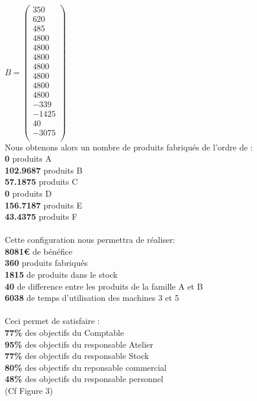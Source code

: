 \documentclass[a4paper, 11pt]{article}
\begin{document}
$ B = \begin{pmatrix}
350\\
620\\
485\\
4800\\
4800\\
4800\\
4800\\
4800\\
4800\\
4800\\
-339\\
-1425\\
40\\
-3075 \\
 \end{pmatrix} $ \\
Nous obtenons alors un nombre de produits fabriqués de l'ordre de : \\
    \textbf{0}         produits A \\
    \textbf{102.9687}  produits B \\
    \textbf{57.1875}   produits C \\
    \textbf{0}         produits D \\
    \textbf{156.7187}  produits E \\
    \textbf{43.4375}   produits F \\
\\
Cette configuration nous permettra de réaliser:\\
    \textbf{8081€}  de bénéfice\\
    \textbf{360}   produits fabriqués\\
    \textbf{1815}  de produits dans le stock\\
    \textbf{40}  de difference entre les produits de la famille A et B\\ 
    \textbf{6038}  de temps d'utilisation des machines 3 et 5\\
\\
Ceci permet de satisfaire : \\
\textbf{77\%} des objectifs du Comptable\\
\textbf{95\%} des objectifs du responsable Atelier\\
\textbf{77\%} des objectifs du responsable Stock\\
\textbf{80\%} des objectifs du reponsable commercial\\
\textbf{48\%} des objectifs du responsable personnel\\
(Cf Figure 3)
\end{document}
